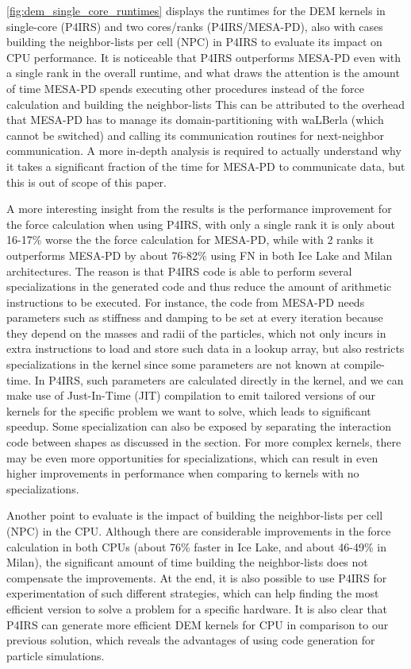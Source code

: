 \documentclass[Afour,sageh,times]{sagej}
\begin{document}
\autoref{fig:dem_single_core_runtimes} displays the runtimes for the \ac{DEM} kernels in single-core (P4IRS) and two cores/ranks (P4IRS/MESA-PD), also with cases building the neighbor-lists per cell (NPC) in P4IRS to evaluate its impact on CPU performance.
It is noticeable that P4IRS outperforms MESA-PD even with a single rank in the overall runtime, and what draws the attention is the amount of time MESA-PD spends executing other procedures instead of the force calculation and building the neighbor-lists
This can be attributed to the overhead that MESA-PD has to manage its domain-partitioning with waLBerla (which cannot be switched) and calling its communication routines for next-neighbor communication.
A more in-depth analysis is required to actually understand why it takes a significant fraction of the time for MESA-PD to communicate data, but this is out of scope of this paper.

A more interesting insight from the results is the performance improvement for the force calculation when using P4IRS, with only a single rank it is only about 16-17\% worse the the force calculation for MESA-PD, while with 2 ranks it outperforms MESA-PD by about 76-82\% using \ac{FN} in both Ice Lake and Milan architectures.
The reason is that P4IRS code is able to perform several specializations in the generated code and thus reduce the amount of arithmetic instructions to be executed.
For instance, the code from MESA-PD needs parameters such as stiffness and damping to be set at every iteration because they depend on the masses and radii of the particles, which not only incurs in extra instructions to load and store such data in a lookup array, but also restricts specializations in the kernel since some parameters are not known at compile-time.
In P4IRS, such parameters are calculated directly in the kernel, and we can make use of Just-In-Time (JIT) compilation to emit tailored versions of our kernels for the specific problem we want to solve, which leads to significant speedup.
Some specialization can also be exposed by separating the interaction code between shapes as discussed in the  section.
For more complex kernels, there may be even more opportunities for specializations, which can result in even higher improvements in performance when comparing to kernels with no specializations.

Another point to evaluate is the impact of building the neighbor-lists per cell (NPC) in the CPU.
Although there are considerable improvements in the force calculation in both CPUs (about 76\% faster in Ice Lake, and about 46-49\% in Milan), the significant amount of time building the neighbor-lists does not compensate the improvements.
At the end, it is also possible to use P4IRS for experimentation of such different strategies, which can help finding the most efficient version to solve a problem for a specific hardware.
It is also clear that P4IRS can generate more efficient DEM kernels for CPU in comparison to our previous solution, which reveals the advantages of using code generation for particle simulations.
\end{document}

